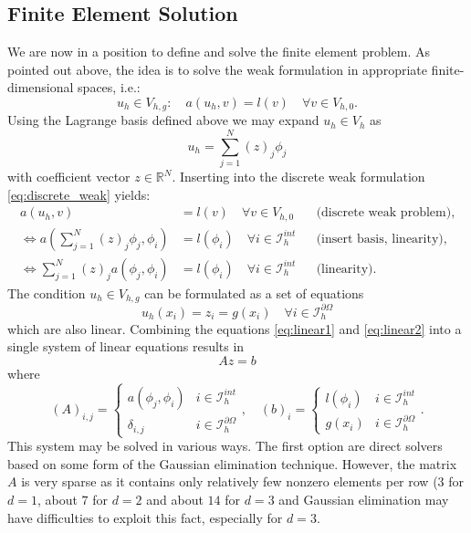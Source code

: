 \documentclass[a4paper,12pt]{article}
\begin{document}
\subsection{Finite Element Solution}

We are now in a position to define and solve the finite element problem.
As pointed out above, the idea is to solve the weak formulation in appropriate
finite-dimensional spaces, i.e.:
\begin{equation*}
u_h\in V_{h,g} : \quad a(u_h,v) = l(v) \quad \forall v\in V_{h,0} .
\label{eq:discrete_weak}
\end{equation*}
Using the Lagrange basis defined above we may expand $u_h\in V_h$ as
\begin{equation*}
u_h = \sum_{j=1}^N (z)_j \phi_j
\end{equation*} 
with coefficient vector $z\in\mathbb{R}^N$. Inserting into the
discrete weak formulation \eqref{eq:discrete_weak} yields:
\begin{align}
a(u_h,v) &= l(v) \quad \forall v\in V_{h,0} &&\text{(discrete weak problem)},\nonumber \\
\Leftrightarrow 
a\left(\sum_{j=1}^N (z)_j \phi_j,\phi_i\right) &= l(\phi_i) \quad \forall i\in \mathcal{I}_h^{int} 
&&\text{(insert basis, linearity)}, \nonumber \\
\Leftrightarrow 
\sum_{j=1}^N (z)_j a\left( \phi_j,\phi_i\right) &= l(\phi_i) \quad \forall i\in \mathcal{I}_h^{int} 
&&\text{(linearity)}. \label{eq:linear1}
\end{align}
The condition $u_h\in V_{h,g}$ can be formulated as a set of equations
\begin{equation}
u_h(x_i) = z_i = g(x_i) \quad\forall i\in\mathcal{I}_h^{\partial\Omega}
\label{eq:linear2}
\end{equation}
which are also linear. Combining the equations \eqref{eq:linear1} and \eqref{eq:linear2}
into a single system of linear equations results in
\begin{equation}
A z = b \label{eq:thesystem}
\end{equation}
where
\begin{equation}
(A)_{i,j} = \left\{\begin{array}{ll}
a(\phi_j,\phi_i) & i\in\mathcal{I}_h^{int}\\
\delta_{i,j} & i\in\mathcal{I}_h^{\partial\Omega}
\end{array}\right., \quad
(b)_{i} = \left\{\begin{array}{ll}
l(\phi_i) & i\in\mathcal{I}_h^{int}\\
g(x_i) & i\in\mathcal{I}_h^{\partial\Omega}
\end{array}\right. .
\label{eq:systemdetail}
\end{equation}
This system may be solved in various ways. The first option are direct solvers
based on some form of the Gaussian elimination technique. However, the matrix $A$
is very sparse as it contains only relatively few nonzero elements per row (3 for $d=1$,
about $7$ for $d=2$ and about $14$ for $d=3$ and Gaussian elimination
may have difficulties to exploit this fact, especially for $d=3$.
\end{document}
